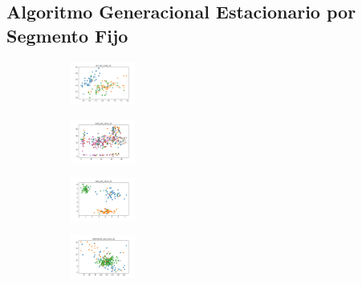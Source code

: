 \vspace*{\fill}
\newpage


\subsection{Algoritmo Generacional Estacionario por Segmento Fijo}

\begin{figure}[H]    
    \centering
    \begin{subfigure}
        \centering
        \includegraphics[width=0.234\textwidth]{img/agesf/iris_set_const_10_949004259_clust.png}
    \end{subfigure}
    \hfill
    \begin{subfigure}
        \centering
        \includegraphics[width=0.234\textwidth]{img/agesf/ecoli_set_const_10_949004259_clust.png}
    \end{subfigure}
    \hfill
    \begin{subfigure}
        \centering
        \includegraphics[width=0.234\textwidth]{img/agesf/rand_set_const_10_949004259_clust.png}
    \end{subfigure}
    \hfill
    \begin{subfigure}
        \centering
        \includegraphics[width=0.234\textwidth]{img/agesf/newthyroid_set_const_10_949004259_clust.png}

\end{subfigure}
\end{figure}
